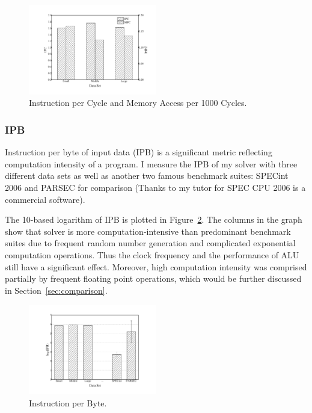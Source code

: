 \begin{figure}[ht]
\centering
\includegraphics[width=0.50\textwidth]{graph/IPC_MPC.pdf}
\caption{Instruction per Cycle and Memory Access per 1000 Cycles.}
\label{fig:ipc_mpc}
\end{figure}

\subsubsection{IPB}
Instruction per byte of input data (IPB) is a significant metric reflecting computation intensity of a program. I measure the IPB of my solver with three different data sets as well as another two famous benchmark suites: SPECint 2006 and PARSEC for comparison (Thanks to my tutor for SPEC CPU 2006 is a commercial software).

The 10-based logarithm of IPB is plotted in Figure~\ref{fig:IPB}. The columns in the graph show that \SA solver is more computation-intensive than predominant benchmark suites due to frequent random number generation and complicated exponential computation operations. Thus the clock frequency and the performance of ALU still have a significant effect. Moreover, high computation intensity was comprised partially by frequent floating point operations, which would be further discussed in Section~\ref{sec:comparison}.

\begin{figure}[ht]
\centering
\includegraphics[width=0.50\textwidth]{graph/IPB.pdf}
\caption{Instruction per Byte.}
\label{fig:IPB}
\end{figure}

